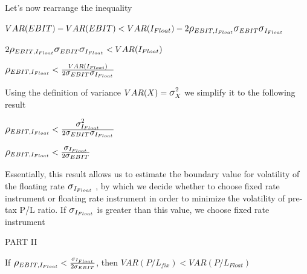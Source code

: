\documentclass[12pt, a4paper]{article}
\begin{document}
Let's now rearrange the inequality

\begin{center}
$VAR(EBIT) - VAR(EBIT) < VAR(I_{Float})- 2\mathlarger{\mathlarger{\rho}}_{EBIT, I_{Float}}\mathlarger{\mathlarger{\sigma}}_{EBIT} \mathlarger{\mathlarger{\sigma}}_{I_{Float}}$

$2\mathlarger{\mathlarger{\rho}}_{EBIT, I_{Float}}\mathlarger{\mathlarger{\sigma}}_{EBIT} \mathlarger{\mathlarger{\sigma}}_{I_{Float}} < VAR(I_{Float})$

\bigskip

$\mathlarger{\mathlarger{\rho}}_{EBIT, I_{Float}} < \frac{VAR(I_{Float})}{2\mathlarger{\mathlarger{\sigma}}_{EBIT} \mathlarger{\mathlarger{\sigma}}_{I_{Float}}}$

\end{center}

Using the definition of variance $VAR(X) = \mathlarger{\mathlarger{\sigma}}_{X}^2$ we simplify it to the following result

\begin{center}
$\mathlarger{\mathlarger{\rho}}_{EBIT, I_{Float}} < \frac{\mathlarger{\mathlarger{\sigma}}_{I_{Float}}^2}{2\mathlarger{\mathlarger{\sigma}}_{EBIT} \mathlarger{\mathlarger{\sigma}}_{I_{Float}}}$

\bigskip

$\mathlarger{\mathlarger{\rho}}_{EBIT, I_{Float}} < \frac{\mathlarger{\mathlarger{\sigma}}_{I_{Float}}}{2\mathlarger{\mathlarger{\sigma}}_{EBIT}}$
\end{center}

Essentially, this result allows us to estimate the boundary value for volatility of the floating rate $\mathlarger{\mathlarger{\sigma}}_{I_{Float}}$ , by which we decide whether to choose fixed rate instrument or floating rate instrument in order to minimize the volatility of pre-tax P/L ratio. If $\mathlarger{\mathlarger{\sigma}}_{I_{Float}}$ is greater than this value, we choose fixed rate instrument

\vspace{1cm}

\begin{center}
PART II


\end{center}

\begin{center}

If $\mathlarger{\mathlarger{\rho}}_{EBIT,I_{Float}} < \frac{\sigma_{I_{Float}}}{2\sigma_{EBIT}}$, then $VAR(P/L_{fix}) < VAR(P/L_{Float})$

\end{center}
\end{document}
